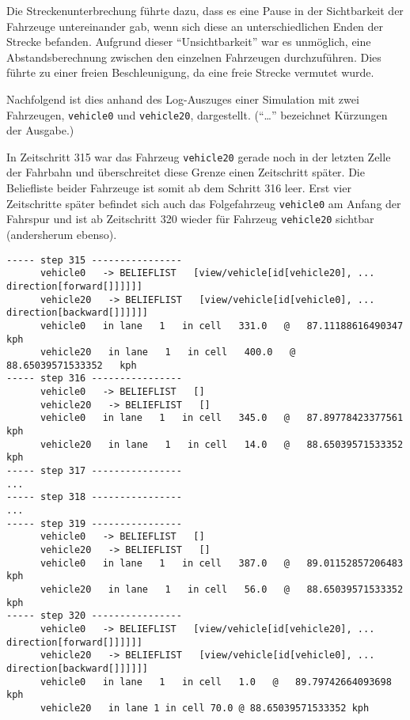 Die Streckenunterbrechung führte dazu, dass es eine Pause in der Sichtbarkeit der Fahrzeuge untereinander gab, wenn sich diese an unterschiedlichen Enden der Strecke befanden.
Aufgrund dieser \enquote{Unsichtbarkeit} war es unmöglich, eine Abstandsberechnung zwischen den einzelnen Fahrzeugen durchzuführen.
Dies führte zu einer freien Beschleunigung, da eine freie Strecke vermutet wurde.

Nachfolgend ist dies anhand des Log-Auszuges einer Simulation mit zwei Fahrzeugen, \texttt{vehicle0} und \texttt{vehicle20}, dargestellt. 
(\enquote{\ldots} bezeichnet Kürzungen der Ausgabe.)

In Zeitschritt 315 war das Fahrzeug \texttt{vehicle20} gerade noch in der letzten Zelle der Fahrbahn und überschreitet diese Grenze einen Zeitschritt später.
Die Beliefliste beider Fahrzeuge ist somit ab dem Schritt 316 leer.
Erst vier Zeitschritte später befindet sich auch das Folgefahrzeug \texttt{vehicle0} am Anfang der Fahrspur und ist ab Zeitschritt 320 wieder für Fahrzeug \texttt{vehicle20} sichtbar (andersherum ebenso).

\newpage

\footnotesize\begin{verbatim}
----- step 315 ----------------
      vehicle0   -> BELIEFLIST   [view/vehicle[id[vehicle20], ... direction[forward[]]]]]]
      vehicle20   -> BELIEFLIST   [view/vehicle[id[vehicle0], ... direction[backward[]]]]]]
      vehicle0   in lane   1   in cell   331.0   @   87.11188616490347   kph
      vehicle20   in lane   1   in cell   400.0   @   88.65039571533352   kph
----- step 316 ----------------
      vehicle0   -> BELIEFLIST   []
      vehicle20   -> BELIEFLIST   []
      vehicle0   in lane   1   in cell   345.0   @   87.89778423377561   kph
      vehicle20   in lane   1   in cell   14.0   @   88.65039571533352   kph
----- step 317 ----------------
...
----- step 318 ----------------
...
----- step 319 ----------------
      vehicle0   -> BELIEFLIST   []
      vehicle20   -> BELIEFLIST   []
      vehicle0   in lane   1   in cell   387.0   @   89.01152857206483   kph
      vehicle20   in lane   1   in cell   56.0   @   88.65039571533352   kph
----- step 320 ----------------
      vehicle0   -> BELIEFLIST   [view/vehicle[id[vehicle20], ... direction[forward[]]]]]]
      vehicle20   -> BELIEFLIST   [view/vehicle[id[vehicle0], ... direction[backward[]]]]]]
      vehicle0   in lane   1   in cell   1.0   @   89.79742664093698   kph
      vehicle20   in lane 1 in cell 70.0 @ 88.65039571533352 kph
\end{verbatim}
\normalsize
\vspace{1em}

